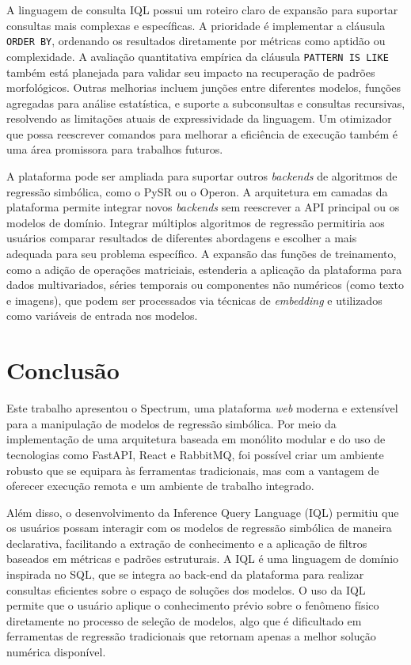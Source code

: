 A linguagem de consulta IQL possui um roteiro claro de expansão para suportar consultas mais complexas e específicas. A prioridade é implementar a cláusula \texttt{ORDER BY}, ordenando os resultados diretamente por métricas como aptidão ou complexidade. A avaliação quantitativa empírica da cláusula \texttt{PATTERN IS LIKE} também está planejada para validar seu impacto na recuperação de padrões morfológicos. Outras melhorias incluem junções entre diferentes modelos, funções agregadas para análise estatística, e suporte a subconsultas e consultas recursivas, resolvendo as limitações atuais de expressividade da linguagem. Um otimizador que possa reescrever comandos para melhorar a eficiência de execução também é uma área promissora para trabalhos futuros.

A plataforma pode ser ampliada para suportar outros \textit{backends} de algoritmos de regressão simbólica, como o PySR ou o Operon. A arquitetura em camadas da plataforma permite integrar novos \textit{backends} sem reescrever a API principal ou os modelos de domínio. Integrar múltiplos algoritmos de regressão permitiria aos usuários comparar resultados de diferentes abordagens e escolher a mais adequada para seu problema específico. A expansão das funções de treinamento, como a adição de operações matriciais, estenderia a aplicação da plataforma para dados multivariados, séries temporais ou componentes não numéricos (como texto e imagens), que podem ser processados via técnicas de \textit{embedding} e utilizados como variáveis de entrada nos modelos.

\section{Conclusão}
Este trabalho apresentou o Spectrum, uma plataforma \textit{web} moderna e extensível para a manipulação de modelos de regressão simbólica. Por meio da implementação de uma arquitetura baseada em monólito modular e do uso de tecnologias como FastAPI, React e RabbitMQ, foi possível criar um ambiente robusto que se equipara às ferramentas tradicionais, mas com a vantagem de oferecer execução remota e um ambiente de trabalho integrado.

Além disso, o desenvolvimento da Inference Query Language (IQL) permitiu que os usuários possam interagir com os modelos de regressão simbólica de maneira declarativa, facilitando a extração de conhecimento e a aplicação de filtros baseados em métricas e padrões estruturais. A IQL é uma linguagem de domínio inspirada no SQL, que se integra ao back-end da plataforma para realizar consultas eficientes sobre o espaço de soluções dos modelos. O uso da IQL permite que o usuário aplique o conhecimento prévio sobre o fenômeno físico diretamente no processo de seleção de modelos, algo que é dificultado em ferramentas de regressão tradicionais que retornam apenas a melhor solução numérica disponível.

